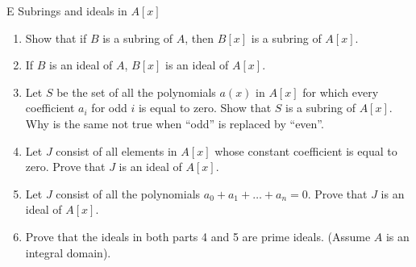 \begin{exercise}{E Subrings and ideals in $A[x]$}
\begin{enumerate}
    \item Show that if $B$ is a subring of $A$, then $B[x]$ is a subring of $A[x]$.
    \item If $B$ is an ideal of $A$, $B[x]$ is an ideal of $A[x]$.
    \item Let $S$ be the set of all the polynomials $a(x)$ in $A[x]$ for which every coefficient $a_i$ for odd $i$ is equal to zero. Show that $S$ is a subring of $A[x]$. Why is the same not true when ``odd'' is replaced by ``even''.
    \item Let $J$ consist of all elements in $A[x]$ whose constant coefficient is equal to zero. Prove that $J$ is an ideal of $A[x]$.
    \item Let $J$ consist of all the polynomials $a_0+a_1+\dots+a_n=0$. Prove that $J$ is an ideal of $A[x]$.
    \item Prove that the ideals in both parts 4 and 5 are prime ideals. (Assume $A$ is an integral domain).
\end{enumerate}
\end{exercise}
